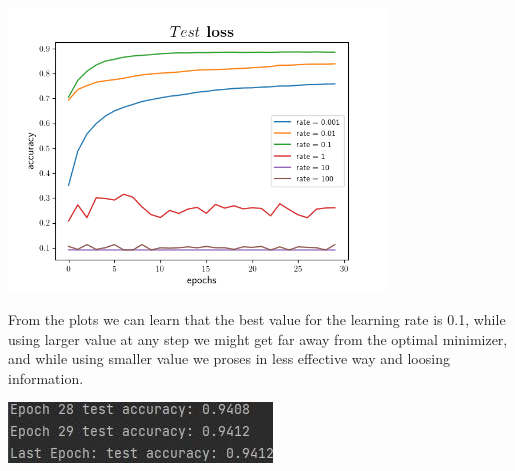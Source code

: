 \documentclass[12pt]{article}
\theoremstyle{plain}
\begin{document}
\begin{center}
\includegraphics[width=100mm]{plot 4.6.png}
\label{fig:nature}
\end{center}




\begin{minipage}{0.6\textwidth}
From the plots we can learn that the best value for the learning rate is 0.1, while using larger value at any step we might get far away from the optimal minimizer, and while using smaller value we proses in less effective  way and loosing information.\end{minipage}
\hspace{0.05\textwidth}
\begin{minipage}{0.4\textwidth}
\vspace{0.4cm}
\includegraphics[width=\textwidth]{plot 4.7.jpg}
\label{fig:nature}
\end{minipage}
\end{document}
